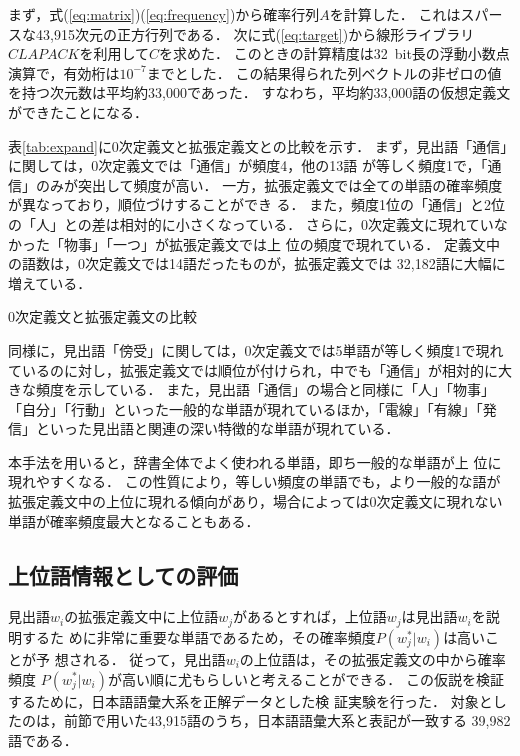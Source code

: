 \documentclass[japanese]{jnlp_1.4}
\begin{document}
まず，式(\ref{eq:matrix})(\ref{eq:frequency})から確率行列$A$を計算した．
これはスパースな43,915次元の正方行列である．
次に式(\ref{eq:target})から線形ライブラリ$CLAPACK$\cite{clapack}を利用して$C$を求めた．
このときの計算精度は32~bit長の浮動小数点演算で，有効桁は$10^{-7}$までとした．
この結果得られた列ベクトルの非ゼロの値を持つ次元数は平均約33,000であった．
すなわち，平均約33,000語の仮想定義文ができたことになる．

表\ref{tab:expand}に0次定義文と拡張定義文との比較を示す．
まず，見出語「通信」に関しては，0次定義文では「通信」が頻度4，他の13語
が等しく頻度1で，「通信」のみが突出して頻度が高い．
一方，拡張定義文では全ての単語の確率頻度が異なっており，順位づけすることができ
る．
また，頻度1位の「通信」と2位の「人」との差は相対的に小さくなっている．
さらに，0次定義文に現れていなかった「物事」「一つ」が拡張定義文では上
位の頻度で現れている．
定義文中の語数は，0次定義文では14語だったものが，拡張定義文では
32,182語に大幅に増えている．

\begin{table}[t]
  \caption{0次定義文と拡張定義文の比較}
  \label{tab:expand}
\begin{center}

\end{center}
\end{table}

同様に，見出語「傍受」に関しては，0次定義文では5単語が等しく頻度1で現れているのに対し，拡張定義文では順位が付けられ，中でも「通信」が相対的に大きな頻度を示している．
また，見出語「通信」の場合と同様に「人」「物事」「自分」「行動」といった一般的な単語が現れているほか，「電線」「有線」「発信」といった見出語と関連の深い特徴的な単語が現れている．

本手法を用いると，辞書全体でよく使われる単語，即ち一般的な単語が上
位に現れやすくなる．
この性質により，等しい頻度の単語でも，より一般的な語が拡張定義文中の上位に現れる傾向があり，場合によっては0次定義文に現れない単語が確率頻度最大となることもある．





\subsection{上位語情報としての評価}
\label{subsec:eval-hyper}

見出語$w_i$の拡張定義文中に上位語$w_j$があるとすれば，上位語$w_j$は見出語$w_i$を説明するた
めに非常に重要な単語であるため，その確率頻度$P(w_j^*|w_i)$は高いことが予
想される．
従って，見出語$w_i$の上位語は，その拡張定義文の中から確率頻度
$P(w_j^*|w_i)$が高い順に尤もらしいと考えることができる．
この仮説を検証するために，日本語語彙大系\cite{goitaikeij}を正解データとした検
証実験を行った．
対象としたのは，前節で用いた43,915語のうち，日本語語彙大系と表記が一致する
39,982語である．
\end{document}
